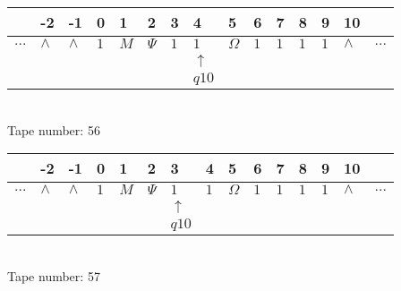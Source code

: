 \documentclass{article}
\begin{document}
\begin{table}[H]
\centering
\begin{tabular}{lllllllllllllll}
 & -2 & -1 & 0 & 1 & 2 & 3 & 4 & 5 & 6 & 7 & 8 & 9 & 10 & \\
\hline
$...$ & \multicolumn{1}{|l|}{$\wedge$} & \multicolumn{1}{|l|}{$\wedge$} & \multicolumn{1}{|l|}{$1$} & \multicolumn{1}{|l|}{$M$} & \multicolumn{1}{|l|}{$\Psi$} & \multicolumn{1}{|l|}{$1$} & \multicolumn{1}{|l|}{$1$} & \multicolumn{1}{|l|}{$\Omega$} & \multicolumn{1}{|l|}{$1$} & \multicolumn{1}{|l|}{$1$} & \multicolumn{1}{|l|}{$1$} & \multicolumn{1}{|l|}{$1$} & \multicolumn{1}{|l|}{$\wedge$} & $...$\\
\hline
&  &  &  &  &  &  & $\uparrow$ &  &  &  &  &  &  &  \\
&  &  &  &  &  &  & $ q10 $ &  &  &  &  &  &  &  \\
\end{tabular}
\\
Tape number: 56
\noindent\makebox[\linewidth]{\hdashrule{\textwidth}{1pt}{1pt}}\end{table}

\begin{table}[H]
\centering
\begin{tabular}{lllllllllllllll}
 & -2 & -1 & 0 & 1 & 2 & 3 & 4 & 5 & 6 & 7 & 8 & 9 & 10 & \\
\hline
$...$ & \multicolumn{1}{|l|}{$\wedge$} & \multicolumn{1}{|l|}{$\wedge$} & \multicolumn{1}{|l|}{$1$} & \multicolumn{1}{|l|}{$M$} & \multicolumn{1}{|l|}{$\Psi$} & \multicolumn{1}{|l|}{$1$} & \multicolumn{1}{|l|}{$1$} & \multicolumn{1}{|l|}{$\Omega$} & \multicolumn{1}{|l|}{$1$} & \multicolumn{1}{|l|}{$1$} & \multicolumn{1}{|l|}{$1$} & \multicolumn{1}{|l|}{$1$} & \multicolumn{1}{|l|}{$\wedge$} & $...$\\
\hline
&  &  &  &  &  & $\uparrow$ &  &  &  &  &  &  &  &  \\
&  &  &  &  &  & $ q10 $ &  &  &  &  &  &  &  &  \\
\end{tabular}
\\
Tape number: 57
\noindent\makebox[\linewidth]{\hdashrule{\textwidth}{1pt}{1pt}}\end{table}
\end{document}
